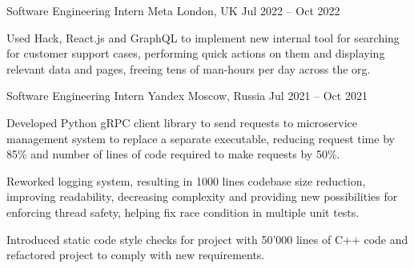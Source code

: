 

\begin{cventries}

  \cventry
  {Software Engineering Intern} %
  {Meta} %
  {London, UK} %
  {Jul 2022 -- Oct 2022} %
  {
    \begin{cvitems} %
      \item Used Hack, React.js and GraphQL to implement new internal tool for searching for customer support cases, performing
      quick actions on them and displaying relevant data and pages, freeing tens of man-hours per day across the org.
    \end{cvitems}
  }

  \cventry
  {Software Engineering Intern} %
  {Yandex} %
  {Moscow, Russia} %
  {Jul 2021 -- Oct 2021} %
  {
    \begin{cvitems} %
      \item Developed Python gRPC client library to send requests to microservice management system to replace a separate executable,
      reducing request time by 85\% and number of lines of code required to make requests by 50\%.
      \item Reworked logging system, resulting in 1000 lines codebase size reduction, improving readability, decreasing complexity
      and providing new possibilities for enforcing thread safety, helping fix race condition in multiple unit tests.
      \item Introduced static code style checks for project with 50'000 lines of C++ code and refactored project to comply with new requirements.
    \end{cvitems}
  }


\end{cventries}
